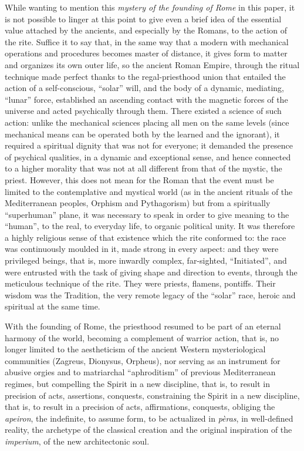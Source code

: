 While wanting to mention this \emph{mystery of the founding of Rome} in this paper, it is not possible to linger at this point to give even a brief idea of the essential value attached by the ancients, and especially by the Romans, to the action of the rite. Suffice it to say that, in the same way that a modern with mechanical operations and procedures becomes master of distance, it gives form to matter and organizes its own outer life, so the ancient Roman Empire, through the ritual technique made perfect thanks to the regal-priesthood union that entailed the action of a self-conscious, ``solar'' will, and the body of a dynamic, mediating, ``lunar'' force, established an ascending contact with the magnetic forces of the universe and acted psychically through them. There existed a science of such action: unlike the mechanical sciences placing all men on the same levels (since mechanical means can be operated both by the learned and the ignorant), it required a spiritual dignity that was not for everyone; it demanded the presence of psychical qualities, in a dynamic and exceptional sense, and hence connected to a higher morality that was not at all different from that of the mystic, the priest. However, this does not mean for the Roman that the event must be limited to the contemplative and mystical world (as in the ancient rituals of the Mediterranean peoples, Orphism and Pythagorism) but from a spiritually ``superhuman'' plane, it was necessary to speak in order to give meaning to the ``human'', to the real, to everyday life, to organic political unity. It was therefore a highly religious sense of that existence which the rite conformed to: the race was continuously moulded in it, made strong in every aspect: and they were privileged beings, that is, more inwardly complex, far-sighted, ``Initiated'', and were entrusted with the task of giving shape and direction to events, through the meticulous technique of the rite. They were priests, flamens, pontiffs. Their wisdom was the Tradition, the very remote legacy of the ``solar'' race, heroic and spiritual at the same time.

With the founding of Rome, the priesthood resumed to be part of an eternal harmony of the world, becoming a complement of warrior action, that is, no longer limited to the aestheticism of the ancient Western mysteriological communities (Zagreus, Dionysus, Orpheus), nor serving as an instrument for abusive orgies and to matriarchal ``aphroditism'' of previous Mediterranean regimes, but compelling the Spirit in a new discipline, that is, to result in precision of acts, assertions, conquests, constraining the Spirit in a new discipline, that is, to result in a precision of acts, affirmations, conquests, obliging the \emph{apeiron}, the indefinite, to assume form, to be actualized in \emph{pèras}, in well-defined reality, the archetype of the classical creation and the original inspiration of the \emph{imperium}, of the new architectonic soul.

